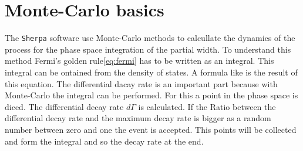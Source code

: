 \section{Monte-Carlo basics}
The \texttt{Sherpa} software use Monte-Carlo methods to calcullate the 
dynamics of the process for the phase space integration of the partial width. 
To understand this method Fermi's golden rule{\eqref{eq:fermi}} has to be written 
as an integral. This integral can be ontained from the density of states. 
A formula like \cite[Eq. 2.38]{diploma} is the result of this equation. The 
differential dacay rate is an important part because with Monte-Carlo the 
integral can be performed. For this a point in the phase space is diced. The 
differential decay rate \(d\Gamma\) is calculated. If the Ratio between the 
differential decay rate and the maximum decay rate is bigger as a random 
number between zero and one the event is accepted. This points will be 
collected and form the integral and so the decay rate at the end.

